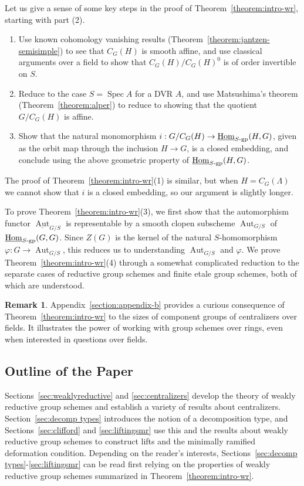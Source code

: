 \documentclass[11pt, letterpaper,english]{amsart}
\theoremstyle{plain}
\theoremstyle{definition}
\newtheorem{remark}[lem]{Remark}
\numberwithin{equation}{section}
\numberwithin{lem}{section}
\newcommand{\vp}{\varphi}
\DeclareMathOperator{\Hom}{Hom}
\DeclareMathOperator{\Aut}{Aut}
\DeclareMathOperator{\Spec}{Spec}
\begin{document}
Let us give a sense of some key steps in the proof of Theorem~\ref{theorem:intro-wr}, starting with part (2).
\begin{enumerate}
    \item Use known cohomology vanishing results (Theorem~\ref{theorem:jantzen-semisimple}) to see that $C_G(H)$ is smooth affine, and use classical arguments over a field to show that $C_G(H)/C_G(H)^0$ is of order invertible on $S$.
    \item Reduce to the case $S = \Spec A$ for a DVR $A$, and use Matsushima's theorem (Theorem~\ref{theorem:alper}) to reduce to showing that the quotient $G/C_G(H)$ is affine.
    \item Show that the natural monomorphism $i: G/C_G(H) \to \underline{\Hom}_{S\textrm{-}\rm{gp}}(H, G)$, given as the orbit map through the inclusion $H \to G$, is a closed embedding, and conclude using the above geometric property of $\underline{\Hom}_{S\textrm{-}\rm{gp}}(H, G)$.
\end{enumerate}
The proof of Theorem~\ref{theorem:intro-wr}(1) is similar, but when $H = C_G(\Lambda)$ we cannot show that $i$ is a closed embedding, so our argument is slightly longer.

To prove Theorem~\ref{theorem:intro-wr}(3), we first show that the automorphism functor $\underline{\Aut}_{G/S}$ is representable by a smooth clopen subscheme $\Aut_{G/S}$ of $\underline{\Hom}_{S\textrm{-}\rm{gp}}(G, G)$. Since $Z(G)$ is the kernel of the natural $S$-homomorphism $\vp: G \to \Aut_{G/S}$, this reduces us to understanding $\Aut_{G/S}$ and $\vp$. We prove Theorem~\ref{theorem:intro-wr}(4) through a somewhat complicated reduction to the separate cases of reductive group schemes and finite etale group schemes, both of which are understood.

%
%
 
%
%

\begin{remark}
Appendix~\ref{section:appendix-b} provides a curious consequence of Theorem~\ref{theorem:intro-wr} to the sizes of component groups of centralizers over fields.  It illustrates the power of working with group schemes over rings, even when interested in questions over fields.
\end{remark}

\subsection{Outline of the Paper}
Sections~\ref{sec:weaklyreductive} and \ref{sec:centralizers} develop the theory of weakly reductive group schemes and establish a variety of results about centralizers.  Section~\ref{sec:decomp types} introduces the notion of a decomposition type, and Sections~\ref{sec:clifford} and \ref{sec:liftingsmr} use this and the results about weakly reductive group schemes to construct lifts and the minimally ramified deformation condition.  Depending on the reader's interests, Sections~\ref{sec:decomp types}-\ref{sec:liftingsmr} can be read first relying  on the properties of weakly reductive group schemes summarized in Theorem~\ref{theorem:intro-wr}.
\end{document}
